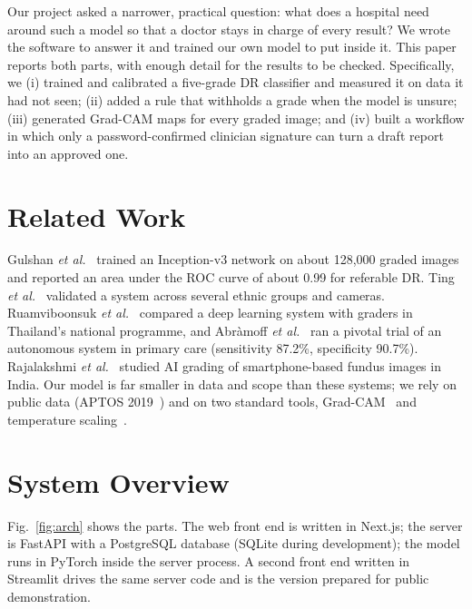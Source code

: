 \documentclass[conference]{IEEEtran}
\begin{document}
Our project asked a narrower, practical question: what does a hospital need around such a model so that a doctor stays
in charge of every result? We wrote the software to answer it and trained our own model to put inside it. This paper
reports both parts, with enough detail for the results to be checked. Specifically, we
(i) trained and calibrated a five-grade DR classifier and measured it on data it had not seen;
(ii) added a rule that withholds a grade when the model is unsure;
(iii) generated Grad-CAM maps for every graded image; and
(iv) built a workflow in which only a password-confirmed clinician signature can turn a draft report into an approved one.

\section{Related Work}
Gulshan \textit{et al.}~\cite{gulshan2016} trained an Inception-v3 network on about 128,000 graded images and reported an
area under the ROC curve of about 0.99 for referable DR. Ting \textit{et al.}~\cite{ting2017} validated a system across
several ethnic groups and cameras. Ruamviboonsuk \textit{et al.}~\cite{ruamviboonsuk2019} compared a deep learning
system with graders in Thailand's national programme, and Abr\`amoff \textit{et al.}~\cite{abramoff2018} ran a pivotal
trial of an autonomous system in primary care (sensitivity 87.2\%, specificity 90.7\%). Rajalakshmi
\textit{et al.}~\cite{rajalakshmi2018} studied AI grading of smartphone-based fundus images in India. Our model is far
smaller in data and scope than these systems; we rely on public data (APTOS 2019~\cite{aptos2019}) and on two standard
tools, Grad-CAM~\cite{selvaraju2017} and temperature scaling~\cite{guo2017}.

\section{System Overview}
Fig.~\ref{fig:arch} shows the parts. The web front end is written in Next.js; the server is FastAPI with a PostgreSQL
database (SQLite during development); the model runs in PyTorch inside the server process. A second front end written
in Streamlit drives the same server code and is the version prepared for public demonstration.
\end{document}
